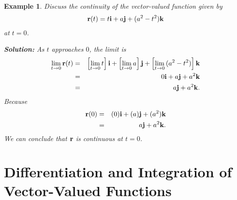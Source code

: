 \documentclass[titlepage,a4paper,12pt]{report}
\newtheorem{example}{Example}[section]
\begin{document}
\begin{example}
Discuss the continuity of the vector-valued function given by 
\[{\bf{r}}(t)=t{\bf{i}}+a{\bf{j}}+(a^2-t^2){\bf{k}}\] at $t=0$.

\noindent \textbf{Solution:} As $t$ approaches $0$, the limit is 
\begin{eqnarray*}
\lim _{t\rightarrow 0} {\bf{r}}(t) &=& \left[ \lim _{t\rightarrow 0}{t}\right]{\bf{i}} +\left[ \lim _{t\rightarrow 0}{a}\right]{\bf{j}}+\left[ \lim _{t\rightarrow 0}{(a^2-t^2)}\right]{\bf{k}}\\
&=& 0{\bf{i}}+a{\bf{j}}+a^2{\bf{k}}\\
&=& a{\bf{j}}+a^2{\bf{k}}.
\end{eqnarray*}
Because 
\begin{eqnarray*}
{\bf{r}}(0) &=& (0){\bf{i}} +(a){\bf{j}} +(a^2){\bf{k}}\\
&=& a{\bf{j}}+a^2{\bf{k}}.
\end{eqnarray*}
We can conclude that ${\bf{r}}$ is continuous at $t=0$.
\end{example}
\section{Differentiation and Integration of Vector-Valued Functions}
\end{document}
